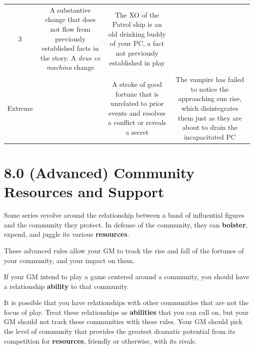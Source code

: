 \documentclass[
]{article}
\begin{document}
\begin{longtable}[]{@{}cccc@{}}
\begin{minipage}[t]{0.06\columnwidth}
3\strut
\end{minipage} & \begin{minipage}[t]{0.28\columnwidth}\centering
A substantive change that does not flow from previously established
facts in the story. A \emph{deus ex machina} change\strut
\end{minipage} & \begin{minipage}[t]{0.28\columnwidth}\centering
The XO of the Patrol ship is an old drinking buddy of your PC, a fact
not previously established in play\strut
\end{minipage}\tabularnewline
\begin{minipage}[t]{0.28\columnwidth}\centering
Extreme\strut
\end{minipage} & \begin{minipage}[t]{0.06\columnwidth}\centering
5\strut
\end{minipage} & \begin{minipage}[t]{0.28\columnwidth}\centering
A stroke of good fortune that is unrelated to prior events and resolves
a conflict or reveals a secret\strut
\end{minipage} & \begin{minipage}[t]{0.28\columnwidth}\centering
The vampire has failed to notice the approaching sun rise, which
disintegrates them just as they are about to drain the incapacitated
PC\strut
\end{minipage}\tabularnewline
\bottomrule
\end{longtable}

\hypertarget{advanced-community-resources-and-support}{%
\section{8.0 (Advanced) Community Resources and
Support}\label{advanced-community-resources-and-support}}

Some series revolve around the relationship between a band of
influential figures and the community they protect. In defense of the
community, they can \textbf{bolster}, expend, and juggle its various
\textbf{resources}.

These advanced rules allow your GM to track the rise and fall of the
fortunes of your community, and your impact on them.

If your GM intend to play a game centered around a community, you should
have a relationship \textbf{ability} to that community.

It is possible that you have relationships with other communities that
are not the focus of play. Treat these relationships as
\textbf{abilities} that you can call on, but your GM should not track
these communities with these rules. Your GM should pick the level of
community that provides the greatest dramatic potential from its
competition for \textbf{resources}, friendly or otherwise, with its
rivals.
\end{document}
